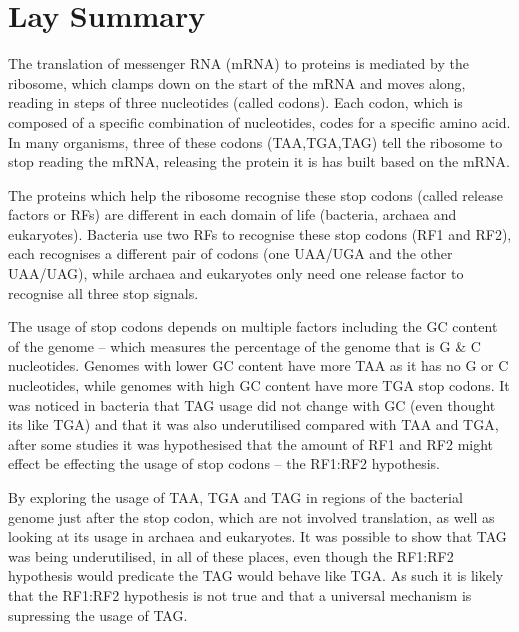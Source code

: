 \documentclass[../main.tex]{subfile}
\begin{document}
    \section*{Lay Summary}

    The translation of messenger RNA (mRNA) to proteins is mediated by the ribosome, which clamps down on the start of the mRNA and moves along, reading in steps of three nucleotides (called codons). Each codon, which is composed of a specific combination of nucleotides, codes for a specific amino acid. In many organisms, three of these codons (TAA,TGA,TAG) tell the ribosome to stop reading the mRNA, releasing the protein it is has built based on the mRNA.

    The proteins which help the ribosome recognise these stop codons (called release factors or RFs) are different in each domain of life (bacteria, archaea and eukaryotes). Bacteria use two RFs to recognise these stop codons (RF1 and RF2), each recognises a different pair of codons (one UAA/UGA and the other UAA/UAG), while archaea and eukaryotes only need one release factor to recognise all three stop signals.

    The usage of stop codons depends on multiple factors including the GC content of the genome -- which measures the percentage of the genome that is G \& C nucleotides. Genomes with lower GC content have more TAA as it has no G or C nucleotides, while genomes with high GC content have more TGA stop codons. It was noticed in bacteria that TAG usage did not change with GC (even thought its like TGA) and that it was also underutilised compared with TAA and TGA, after some studies it was hypothesised that the amount of RF1 and RF2 might effect be effecting the usage of stop codons -- the RF1:RF2 hypothesis.

    By exploring the usage of TAA, TGA and TAG in regions of the bacterial genome just after the stop codon, which are not involved translation, as well as looking at its usage in archaea and eukaryotes. It was possible to show that TAG was being underutilised, in all of these places, even though the RF1:RF2 hypothesis would predicate the TAG would behave like TGA. As such it is likely that the RF1:RF2 hypothesis is not true and that a universal mechanism is supressing the usage of TAG.
\end{document}
